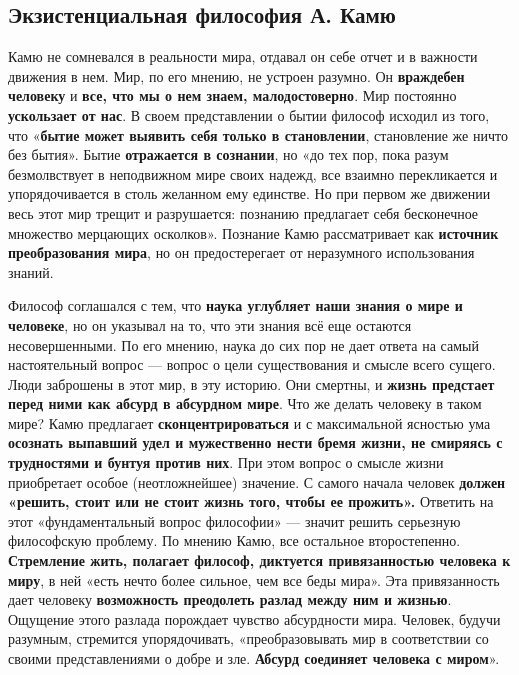 \documentclass{article}
\begin{document}
\pagebreak
\subsection{Экзистенциальная философия А. Камю}

\begin{flushleft}

Камю не сомневался в реальности мира, отдавал он себе отчет и в важности движения в нем. Мир, по его мнению, не устроен разумно. Он \textbf{враждебен человеку} и \textbf{все, что мы о нем знаем, малодостоверно}. Мир постоянно \textbf{ускользает от нас}. В своем представлении о бытии философ исходил из того, что «\textbf{бытие может выявить себя только в становлении}, становление же ничто без бытия». Бытие \textbf{отражается в сознании}, но «до тех пор, пока разум безмолвствует в неподвижном мире своих надежд, все взаимно перекликается и упорядочивается в столь желанном ему единстве. Но при первом же движении весь этот мир трещит и разрушается: познанию предлагает себя бесконечное множество мерцающих осколков». Познание Камю рассматривает как \textbf{источник преобразования мира}, но он предостерегает от неразумного использования знаний.

\hfill

Философ соглашался с тем, что \textbf{наука углубляет наши знания о мире и человеке}, но он указывал на то, что эти знания всё еще остаются несовершенными. По его мнению, наука до сих пор не дает ответа на самый настоятельный вопрос — вопрос о цели существования и смысле всего сущего. Люди заброшены в этот мир, в эту историю. Они смертны, и \textbf{жизнь предстает перед ними как абсурд в абсурдном мире}. Что же делать человеку в таком мире? Камю предлагает \textbf{сконцентрироваться} и с максимальной ясностью ума \textbf{осознать выпавший удел и мужественно нести бремя жизни, не смиряясь с трудностями и бунтуя против них}. При этом вопрос о смысле жизни приобретает особое (неотложнейшее) значение. С самого начала человек \textbf{должен «решить, стоит или не стоит жизнь того, чтобы ее прожить».} Ответить на этот «фундаментальный вопрос философии» — значит решить серьезную философскую проблему. По мнению Камю, все остальное второстепенно. \textbf{Стремление жить, полагает философ, диктуется привязанностью человека к миру}, в ней «есть нечто более сильное, чем все беды мира». Эта привязанность дает человеку \textbf{возможность преодолеть разлад между ним и жизнью}. Ощущение этого разлада порождает чувство абсурдности мира. Человек, будучи разумным, стремится упорядочивать, «преобразовывать мир в соответствии со своими представлениями о добре и зле. \textbf{Абсурд соединяет человека с миром}».


\end{flushleft}
\end{document}
